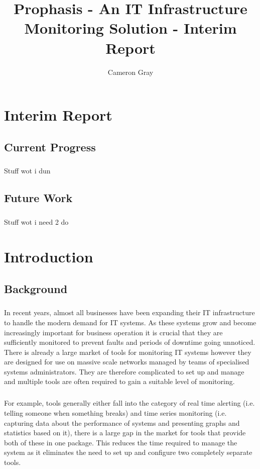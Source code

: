 \documentclass[bsc,logo,twoside]{infthesis}
\title{Prophasis - An IT Infrastructure Monitoring Solution - Interim Report}
\author{Cameron Gray}
\begin{document}
\maketitle
\tableofcontents

\chapter{Interim Report}
\section{Current Progress}
\paragraph*{}
	Stuff wot i dun

\section{Future Work}
\paragraph*{}
	Stuff wot i need 2 do

\chapter{Introduction}
\section{Background}
\paragraph*{}
	In recent years, almost all businesses have been expanding their IT 
	infrastructure to handle the modern demand for IT systems.  As these systems
	grow and become increasingly important for business operation it is crucial
	that they are sufficiently monitored to prevent faults and periods of downtime
	going unnoticed.  There is already a large market of tools for monitoring
	IT systems however they are designed for use on massive scale networks managed
	by teams of specialised systems administrators.  They are therefore
	complicated to set up and manage and multiple tools are often required to gain
	a suitable level of monitoring.
	
\paragraph*{}
	For example, tools generally either fall into
	the category of real time alerting (i.e. telling someone when something
	breaks) and time series monitoring (i.e. capturing data about the performance
	of systems and presenting graphs and statistics based on it), there is a large
	gap in the market for tools that provide both of these in one package. This
	reduces the time required to manage the system as it eliminates the need to
	set up and configure two completely separate tools.
\end{document}
